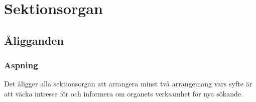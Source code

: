 \section{Sektionsorgan}

\subsection{Åligganden}

\subsubsection{Aspning}
Det åligger alla sektionsorgan att arrangera minst två arrangemang vars syfte är att väcka intresse för och informera om organets verksamhet för nya sökande.